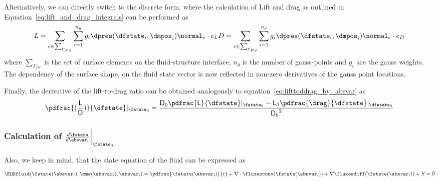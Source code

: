 \documentclass[../main.tex]{subfiles}
\begin{document}
Alternatively, we can directly switch to the discrete form, where the calculation of Lift and drag as outlined in Equation~\eqref{eq:lift_and_drag_integrals} can be performed as
\begin{align}\label{eq:discrete_lift_and_drag_formulas}
L=\sum_{e \in \sum_{\Gamma_{FS}}} \sum_{i=1}^{n_g} g_i \dpres(\dfstate_i,\dmpos_i) \normal_e \cdot e_L
D=\sum_{e \in \sum_{\Gamma_{FS}}} \sum_{i=1}^{n_g} g_i \dpres(\dfstate_i,\dmpos_i) \normal_e \cdot e_D
\end{align}
where $\sum_{\Gamma_{FS}}$ is the set of surface elements on the fluid-structure interface, $n_g$ is the number of gauss-points and $g_i$ are the gauss weights. The dependency of the surface shape, on the fluid state vector is now reflected in non-zero derivatives of the gauss point locations.

Finally, the derivative of the lift-to-drag ratio can be obtained analogously to equation~\eqref{eq:lifttoddrag_by_absvar} as
\begin{align}\label{eq:lifttodrag_by_dfstate}
\pdfrac{(\frac{\mathsf{L}}{\mathsf{D}})}{\dfstate}\rvert_{\fstate_0}=
\frac{\mathsf{D}_0 \pdfrac{\mathsf{L}}{\dfstate}\rvert_{\fstate_0} - \mathsf{L}_0 \pdfrac{\drag}{\dfstate}\rvert_{\dfstate_0} }{{\mathsf{D}_0}^2}
\end{align}


\subsubsection{Calculation of $\DfstateBYabsvarI\bigg\rvert_{\fstate_0}$}

Also, we keep in mind, that the state equation of the fluid can be expressed as
\begin{align}
\EOSfluid(\fstate(\absvar_i),\mms(\absvar_i),\absvar_i)=
\pdfrac{\fstate(\absvar_i)}{t}+\nabla\cdot\fluxesconv(\fstate(\absvar_i))+\nabla\fluxesdiff(\fstate(\absvar_i))+S=
\vec{0}
\end{align}
\end{document}
